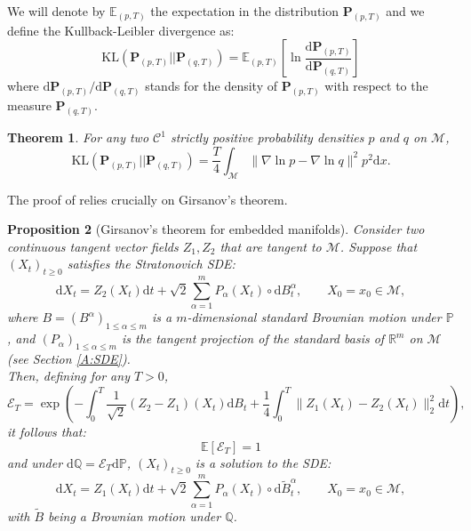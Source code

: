 \documentclass[10pt,a4paper]{article}
\newcommand{\E}{{\mathbb E}}
\renewcommand{\P}{{\mathbf P}}
\newcommand\dd{\mathrm{d}}
\newcommand{\SBRA}[1]{{{\left[#1\right]}}} %
\newtheorem{theorem}{Theorem}[section]
\newtheorem{proposition}[theorem]{Proposition}
\begin{document}
We will denote by $\E_{(p,T)}$ the expectation in the distribution \(\P_{(p,T)}\) and we define the Kullback-Leibler divergence as:
\begin{equation}
    \mathrm{KL}(\P_{(p,T)} || \P_{(q,T)} )= \E_{(p,T)}\SBRA{\ln \frac{\dd\P_{(p,T)}}{\dd\P_{(q,T)}}}
\end{equation}where $\dd\P_{(p,T)}/\dd\P_{(q,T)}$ stands for the density of \(\P_{(p,T)}\) with respect to the measure \(\P_{(q,T)}\).

	\begin{theorem}
		\label{theorem: KL for path space measures}
		For any two \(\mathcal{C}^1\) strictly positive probability densities \(p\) and \(q\) on \(\mathcal{M}\), 
\begin{equation}	
		\mathrm{KL}(\P_{(p,T)} || \P_{(q,T)} ) 
		= \frac{T}{4}  \int_\mathcal{M} \| \nabla \ln p-\nabla \ln q\|^2 p^2 \dd x.
\end{equation}		
			\end{theorem}
	

The proof of  relies crucially on Girsanov's theorem.	

	
	\begin{proposition}[Girsanov's theorem for embedded manifolds]
		\label{proposition: Girsanov's theorem for embedded manifold}
		Consider two continuous tangent vector fields \(Z_1,Z_2\) that are tangent to \(\mathcal{M}\). Suppose that $(X_t)_{t\ge 0}$ satisfies the Stratonovich SDE:
		\[ \mathrm{d} X_t= Z_2(X_t)\mathrm{d}t + \sqrt{2}\sum_{\alpha=1}^m P_\alpha (X_t) \circ \mathrm{d}B^\alpha_t, \qquad X_0 = x_0 \in \mathcal{M}, \]
		where \(B=(B^\alpha)_{1\le \alpha\le m}\) is a \(m\)-dimensional standard Brownian motion under \(\mathbb{P}\), and \((P_\alpha)_{1\le \alpha\le m}\) is the tangent projection of the standard basis of \(\mathbb{R}^m\) on \(\mathcal{M}\) (see Section \ref{A:SDE}).\\
		Then, defining for any $T>0$,
		\begin{equation}\label{martingale-expo-annexe}\mathcal{E}_T=\exp \left( - \int_0^T \frac{1}{\sqrt{2}}(Z_2-Z_1)(X_t)\mathrm{d}B_t +\frac{1}{4} \int_0^T \|Z_1(X_t)-Z_2(X_t) \|^2_2 \mathrm{d} t\right),\end{equation}
		 it follows that:
		\[ \mathbb{E}[ \mathcal{E}_T]=1 \]
		and under \(\mathrm{d} \mathbb{Q}= \mathcal{E}_T \mathrm{d} \mathbb{P}\), $(X_t)_{t\ge 0}$ is a solution to the SDE:
		\[ \mathrm{d} X_t= Z_1(X_t)\mathrm{d}t + \sqrt{2}\sum_{\alpha=1}^m P_\alpha(X_t) \circ \mathrm{d}\widetilde{B}^\alpha_t, \qquad X_0 = x_0 \in \mathcal{M}, \]
		with $\widetilde{B}$ being a Brownian motion under \(\mathbb{Q}\).
	\end{proposition}
	
\end{document}
